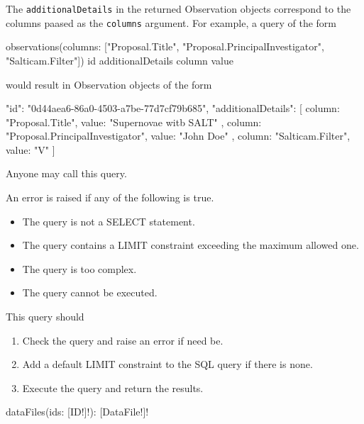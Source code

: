 The \verb|additionalDetails| in the returned Observation objects correspond to the columns paased as the \verb|columns| argument. For example, a query of the form

\begin{code}
observations(columns: ["Proposal.Title", "Proposal.PrincipalInvestigator", "Salticam.Filter"]) {
  id
  additionalDetails {
    column
    value
  }
}
\end{code}

would result in Observation objects of the form

\begin{code}
{
  "id": "0d44aea6-86a0-4503-a7be-77d7cf79b685",
  "additionalDetails": [
    { column: "Proposal.Title", value: "Supernovae witb SALT" },
    { column: "Proposal.PrincipalInvestigator", value: "John Doe" },
    { column: "Salticam.Filter", value: "V" }
  ]
}
\end{code}

\restrictions

Anyone may call this query.

\errors

An error is raised if any of the following is true.

\begin{itemize}
    \item The query is not a SELECT statement.
    \item The query contains a LIMIT constraint exceeding the maximum allowed one.
    \item The query is too complex.
    \item The query cannot be executed.
\end{itemize}

\functionality

This query should

\begin{enumerate}
    \item Check the query and raise an error if need be.
    \item Add a default LIMIT constraint to the SQL query if there is none.
    \item Execute the query and return the results.
\end{enumerate}


\begin{code}
dataFiles(ids: [ID!]!): [DataFile!]!
\end{code}

